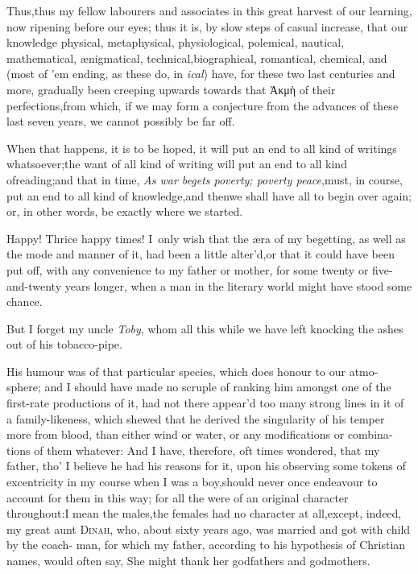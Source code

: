 \documentclass{article}
\begin{document}
Thus,\tsk  thus my fellow labourers and associates in this great harvest of
our learning, now ripening before our eyes; thus it is, by slow steps of casual
increase, that our knowledge physical, metaphysical, physiological, polemical,
nautical, mathematical, ænigmatical, technical,\break biographical, romantical,
chemical, and 
\break
(most of ’em ending, as these do, in \textit{ical}) 
have, for these two last centuries and more, gradually been creeping upwards towards that Ἀκμὴ of their
perfections,\break from which, if we may form a conjecture from the advances of these last
seven years, we cannot possibly be far off.

When that happens, it is to be hoped, it will put an end to all
kind of writings whatsoever;\tsk  the want of all kind of writing
will put an end to all kind of\break reading;\tsk  and that in time,
\textit{As war be\-gets poverty; poverty peace},\tsh  must, in
course, put an end to all kind of know\-ledge,\tsk  and
then\tsh  we shall have all to begin over again; or, in
other words, be exactly where we started.

\tsh  Happy! Thrice happy times! I~only wish that the æra of my begetting, as well
as the mode and manner of it, had been a little alter’d,\tsk  or that it could have
been put off, with any convenience to my father or mother, for some twenty or
five-and-twenty years longer, when a man in the literary world might have\break
stood some chance.\tsh 

But I forget my uncle \textit{Toby}, whom all this while we have
left knocking the ashes out of his tobacco-pipe.

His humour was of that particular\break
species, which does honour to our atmo-
sphere; and I should have made no scruple of ranking him
amongst one of the first-rate productions of it, had not there
appear’d too many strong lines in it of a family-likeness, which
shewed that he derived the singularity of his temper\break
more from blood, than either wind or\break 
water, or any modifications or combina-\break
tions of them whatever: And I have, therefore, oft times
wondered, that my father, tho’ I believe he had his reasons
for it, upon his observing some tokens of excentricity in my
course when I was a boy,\tsk  should never once endeavour to
account for them in this way; for all the\break
{} were of an original character
throughout:\tsh  I mean the males,\tsk  the females had no
character at all,\tsk  except, indeed, my great aunt
\textsc{Dinah}, who, about sixty years ago, was married and got with child by the
coach- man,
for which my father, according to his hypothesis of Christian
names, would often say, She might thank her godfathers and
godmothers.
\end{document}
